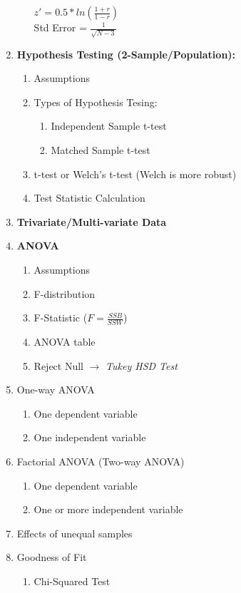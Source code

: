 \documentclass[11pt]{article}
\begin{document}
\begin{enumerate}
\begin{enumerate}
			$z' = 0.5 * ln(\frac{1 + r}{1 - r})  $ \\
			Std Error = $\frac{1}{\sqrt{N - 3}}$
		\end{enumerate}
		\item \textbf{Hypothesis Testing (2-Sample/Population):}
		\begin{enumerate}
			\item Assumptions
			\item Types of Hypothesis Tesing:
			\begin{enumerate}
				\item Independent Sample t-test
				\item Matched Sample t-test
			\end{enumerate}
			\item t-test or Welch's t-test (Welch is more robust)
			\item Test Statistic Calculation
		\end{enumerate}
		\item \textbf{Trivariate/Multi-variate Data}
		\item \textbf{ANOVA}
		\begin{enumerate}
			\item Assumptions
			\item F-distribution
			\item F-Statistic ($F = \frac{SSB}{SSW}$)
			\item ANOVA table
			\item Reject Null $\to$ \textit{Tukey HSD Test}
		\end{enumerate}
		\item One-way ANOVA
		\begin{enumerate}
			\item One dependent variable
			\item One independent variable
		\end{enumerate}
		\item Factorial ANOVA (Two-way ANOVA)
		\begin{enumerate}
			\item One dependent variable
			\item One or more independent variable
		\end{enumerate}
		\item Effects of unequal samples
		\item Goodness of Fit
		\begin{enumerate}
			\item Chi-Squared Test
			\begin{enumerate}

\end{enumerate}
\end{enumerate}
\end{enumerate}
\end{document}

